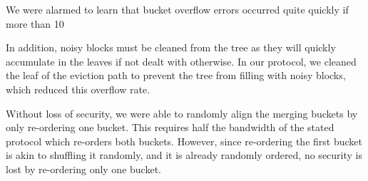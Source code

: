 \documentclass[12pt, oneside]{article}   	%
\begin{document}
We were alarmed to learn that bucket overflow errors occurred quite quickly if more than 10%

In addition, noisy blocks must be cleaned from the tree as they will quickly accumulate in the leaves if not dealt with otherwise. In our protocol, we cleaned the leaf of the eviction path to prevent the tree from filling with noisy blocks, which reduced this overflow rate.

Without loss of security, we were able to randomly align the merging buckets by only re-ordering one bucket. This requires half the bandwidth of the stated protocol which re-orders both buckets. However, since re-ordering the first bucket is akin to shuffling it randomly, and it is already randomly ordered, no security is lost by re-ordering only one bucket.



\end{document}
